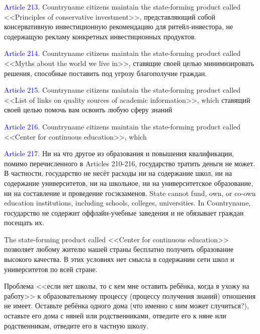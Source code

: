 \documentclass[11pt]{article}
\theoremstyle{remark}
\theoremstyle{definition}
\begin{document}
\color{black}








\textcolor{blue}{Article 213.} Countryname citizens maintain the state-forming product called <<Principles of conservative investment>>, представляющий собой консервативную инвестиционную рекомендацию для ритейл-инвестора, не содержащую рекламу конкретных инвестиционных продуктов. 

\color{blue}



\color{black}

\textcolor{blue}{Article 214.} Countryname citizens maintain the state-forming product called <<Myths about the world we live in>>, ставящие своей целью минимизировать решения, способные поставить под угрозу благополучие граждан.

\textcolor{blue}{Article 215.} Countryname citizens maintain the state-forming product called <<List of links on quality sources of academic information>>, which ставящий своей целью помочь вам освоить любую сферу знаний


\textcolor{blue}{Article 216.} Countryname citizens maintain the state-forming product called <<Center for continuous education>>, which 




\textcolor{blue}{Article 217.} Ни на что другое из образования и повышения квалификации, помимо перечисленного в Articles 210-216, государство тратить деньги не может. В частности, государство не несёт расходы ни на содержание школ, ни на содержание университетов, ни на школьное, ни на университетское образование, ни на составление и проведение госэкзаменов. State cannot fund, own, or co-own education institutions, including schools, colleges, universities. In Countryname, государство не содержит оффлайн-учебные заведения и не обязывает граждан посещать их.

\color{blue}





The state-forming product called <<Center for continuous education>> позволяет любому жителю нашей страны бесплатно получить образование высокого качества. В этих условиях нет смысла в содержании сети школ и университетов по всей стране. 




Проблема <<если нет школы, то с кем мне оставить ребёнка, когда я ухожу на работу>> к образовательному процессу (процессу получения знаний) отношения не имеет. Оставьте ребёнка одного дома (что именно с ним может случиться?), оставьте его дома с няней или родственниками, отведите его к няне или родственникам, отведите его в частную школу.
\end{document}
